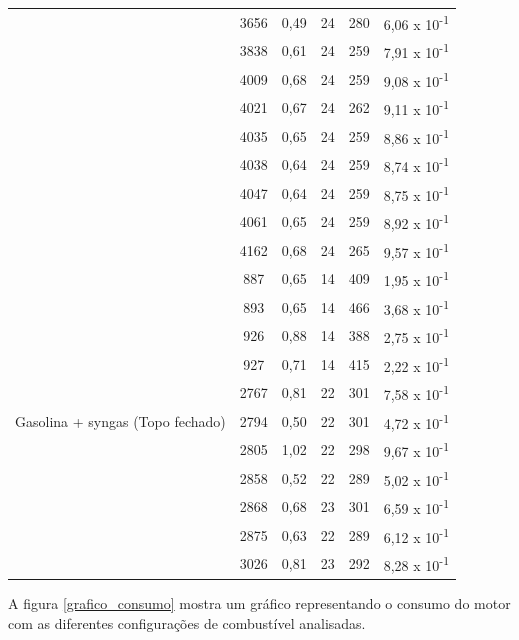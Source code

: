 \begin{table}[h]
\begin{tabular}{|c|c|c|c|c|c|}
		& 3656 & 0,49 & 24 & 280 & 6,06 x 10\textsuperscript{-1}\\
		& 3838 & 0,61 & 24 & 259 & 7,91 x 10\textsuperscript{-1}\\
		& 4009 & 0,68 & 24 & 259 & 9,08 x 10\textsuperscript{-1}\\
		& 4021 & 0,67 & 24 & 262 & 9,11 x 10\textsuperscript{-1}\\
		& 4035 & 0,65 & 24 & 259 & 8,86 x 10\textsuperscript{-1}\\
		& 4038 & 0,64 & 24 & 259 & 8,74 x 10\textsuperscript{-1}\\
		& 4047 & 0,64 & 24 & 259 & 8,75 x 10\textsuperscript{-1}\\
		& 4061 & 0,65 & 24 & 259 & 8,92 x 10\textsuperscript{-1}\\
		& 4162 & 0,68 & 24 & 265 & 9,57 x 10\textsuperscript{-1}\\
		\hline
		\multirow{12}{4.5cm}{Gasolina + syngas (Topo fechado)}
		& 887 & 0,65 & 14 & 409 & 1,95 x 10\textsuperscript{-1}\\
		& 893 & 0,65 & 14 & 466 & 3,68 x 10\textsuperscript{-1}\\
		& 926 & 0,88 & 14 & 388 & 2,75 x 10\textsuperscript{-1}\\
		& 927 & 0,71 & 14 & 415 & 2,22 x 10\textsuperscript{-1}\\
		& 2767 & 0,81 & 22 & 301 & 7,58 x 10\textsuperscript{-1}\\
		& 2794 & 0,50 & 22 & 301 & 4,72 x 10\textsuperscript{-1}\\
		& 2805 & 1,02 & 22 & 298 & 9,67 x 10\textsuperscript{-1}\\
		& 2858 & 0,52 & 22 & 289 & 5,02 x 10\textsuperscript{-1}\\
		& 2868 & 0,68 & 23 & 301 & 6,59 x 10\textsuperscript{-1}\\
		& 2875 & 0,63 & 22 & 289 & 6,12 x 10\textsuperscript{-1}\\
		& 3026 & 0,81 & 23 & 292 & 8,28 x 10\textsuperscript{-1}\\	
		\hline
	\end{tabular}
	\label{tabela_resultados}
\end{table}	

A figura \ref{grafico_consumo} mostra um gráfico representando o consumo do motor com as diferentes configurações de combustível analisadas.

